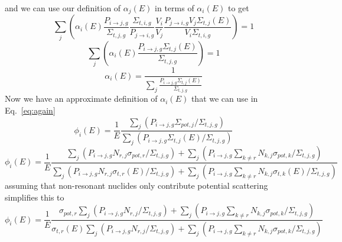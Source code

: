 \documentclass[10pt]{article}
\begin{document}
      and we can use our definition of $\alpha_j(E)$ in terms of $\alpha_i(E)$ to get 
    \begin{equation}\sum\limits_{j}\left(\alpha_{i}(E)\frac{P_{i\rightarrow j,g}}{\Sigma_{t,j,g}}\frac{\Sigma_{t,i,g}}{P_{j\rightarrow i,g}}\frac{V_{i}}{V_{j}}\frac{P_{j\rightarrow i,g}V_{j}\Sigma_{t,j}(E)}{V_{i}\Sigma_{t,i,g}}\right)=1\end{equation}
    \begin{equation}\sum\limits_{j}\left(\alpha_{i}(E)\frac{P_{i\rightarrow j,g}\Sigma_{t,j}(E)}{\Sigma_{t,j,g}}\right)=1\end{equation}
      \begin{equation}\alpha_i(E)=\frac{1}{\sum\limits_{j}\frac{P_{i\rightarrow j,g}\Sigma_{t,j}(E)}{\Sigma_{t,j,g}}}\end{equation}
        Now we have an approximate definition of $\alpha_i(E)$ that we can use in Eq.~\ref{eq:again}
  \begin{equation}\phi_{i}(E)=\frac{1}{E}\frac{\sum\limits_j\left(P_{i\rightarrow j,g}\Sigma_{pot,j}\Big/\Sigma_{t,j,g}\right)}{\sum\limits_{j}\left(P_{i\rightarrow j,g}\Sigma_{t,j}(E)\Big/\Sigma_{t,j,g}\right)}\end{equation}
    \begin{equation}\phi_{i}(E)=\frac{1}{E}\frac{\sum\limits_j\left(P_{i\rightarrow j,g}N_{r,j}\sigma_{pot,r}\Big/\Sigma_{t,j,g}\right) +\sum\limits_j\left(P_{i\rightarrow j,g}\sum\limits_{k\neq r}N_{k,j}\sigma_{pot,k}\Big/\Sigma_{t,j,g}\right) }{
    \sum\limits_{j}\left(P_{i\rightarrow j,g}N_{r,j}\sigma_{t,r}(E)\Big/\Sigma_{t,j,g}\right) + \sum\limits_{j}\left(P_{i\rightarrow j,g}\sum\limits_{k\neq r}N_{k,j}\sigma_{t,k}(E)\Big/\Sigma_{t,j,g}\right)}\end{equation}
assuming that non-resonant nuclides only contribute potential scattering simplifies this to 
    \begin{equation}\phi_{i}(E)=\frac{1}{E}\frac{\sigma_{pot,r}\sum\limits_j\left(P_{i\rightarrow j,g}N_{r,j}\Big/\Sigma_{t,j,g}\right) +\sum\limits_j\left(P_{i\rightarrow j,g}\sum\limits_{k\neq r}N_{k,j}\sigma_{pot,k}\Big/\Sigma_{t,j,g}\right) }{
    \sigma_{t,r}(E)\sum\limits_{j}\left(P_{i\rightarrow j,g}N_{r,j}\Big/\Sigma_{t,j,g}\right) + \sum\limits_{j}\left(P_{i\rightarrow j,g}\sum\limits_{k\neq r}N_{k,j}\sigma_{pot,k}\Big/\Sigma_{t,j,g}\right)}\end{equation}
\end{document}

